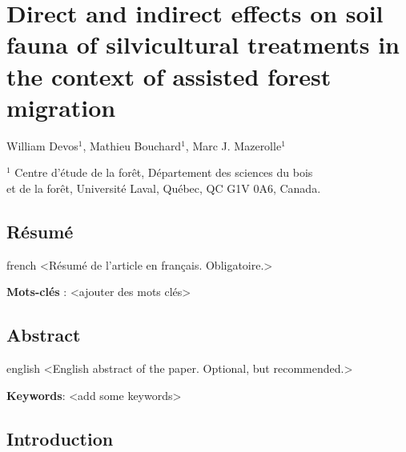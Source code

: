 \chapter{Direct and indirect effects on soil fauna of silvicultural treatments in the context of assisted forest migration}     %
\label{chapitre1-articles}    

William Devos$^1$, Mathieu Bouchard$^1$, Marc J. Mazerolle$^1$

$^1$ Centre d'étude de la forêt, Département des sciences du bois \\ 
et de la forêt, Université Laval, Québec, QC G1V 0A6, Canada. \\ 

\clearpage

\section*{Résumé}
\label{sec:resume1}

\begin{otherlanguage*}{french}
  <Résumé de l'article en français. Obligatoire.>

  \textbf{Mots-clés} : <ajouter des mots clés>
\end{otherlanguage*}

\clearpage

\section*{Abstract}
\label{sec:abstract1}

\begin{otherlanguage*}{english}
  <English abstract of the paper. Optional, but recommended.>

\textbf{Keywords}: <add some keywords> 
\end{otherlanguage*}

\cleardoublepage

\section*{Introduction}
\label{sec:intro1}


